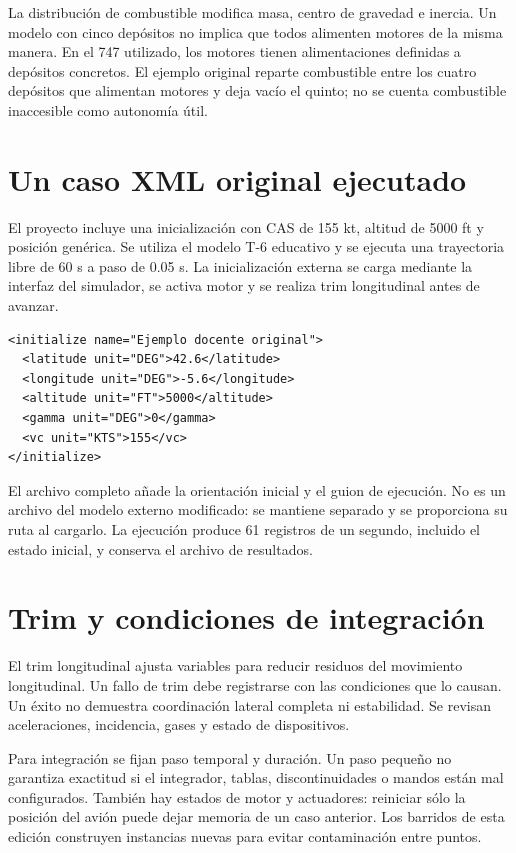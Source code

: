 La distribución de combustible modifica masa, centro de gravedad e inercia. Un modelo con cinco depósitos no implica que todos alimenten motores de la misma manera. En el 747 utilizado, los motores tienen alimentaciones definidas a depósitos concretos. El ejemplo original reparte combustible entre los cuatro depósitos que alimentan motores y deja vacío el quinto; no se cuenta combustible inaccesible como autonomía útil.

\section{Un caso XML original ejecutado}
El proyecto incluye una inicialización con CAS de 155 kt, altitud de 5000 ft y posición genérica. Se utiliza el modelo T-6 educativo y se ejecuta una trayectoria libre de 60 s a paso de 0.05 s. La inicialización externa se carga mediante la interfaz del simulador, se activa motor y se realiza trim longitudinal antes de avanzar.

\begin{verbatim}
<initialize name="Ejemplo docente original">
  <latitude unit="DEG">42.6</latitude>
  <longitude unit="DEG">-5.6</longitude>
  <altitude unit="FT">5000</altitude>
  <gamma unit="DEG">0</gamma>
  <vc unit="KTS">155</vc>
</initialize>
\end{verbatim}
El archivo completo añade la orientación inicial y el guion de ejecución. No es un archivo del modelo externo modificado: se mantiene separado y se proporciona su ruta al cargarlo. La ejecución produce 61 registros de un segundo, incluido el estado inicial, y conserva el archivo de resultados.

\section{Trim y condiciones de integración}
El trim longitudinal ajusta variables para reducir residuos del movimiento longitudinal. Un fallo de trim debe registrarse con las condiciones que lo causan. Un éxito no demuestra coordinación lateral completa ni estabilidad. Se revisan aceleraciones, incidencia, gases y estado de dispositivos.

Para integración se fijan paso temporal y duración. Un paso pequeño no garantiza exactitud si el integrador, tablas, discontinuidades o mandos están mal configurados. También hay estados de motor y actuadores: reiniciar sólo la posición del avión puede dejar memoria de un caso anterior. Los barridos de esta edición construyen instancias nuevas para evitar contaminación entre puntos.

